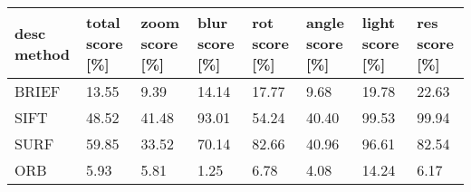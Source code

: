 \begin{tabular}{ l l l l l l l l }
	desc method & total score [\%] & zoom score [\%] & blur score [\%] & rot score [\%] & angle score [\%] & light score [\%] & res score [\%] \\
	\hline
	 BRIEF & 13.55 & 9.39 & 14.14 & 17.77 & 9.68 & 19.78 & 22.63 \\
	 SIFT & 48.52 & 41.48 & 93.01 & 54.24 & 40.40 & 99.53 & 99.94 \\
	 SURF & 59.85 & 33.52 & 70.14 & 82.66 & 40.96 & 96.61 & 82.54 \\
	 ORB & 5.93 & 5.81 & 1.25 & 6.78 & 4.08 & 14.24 & 6.17
\end{tabular}